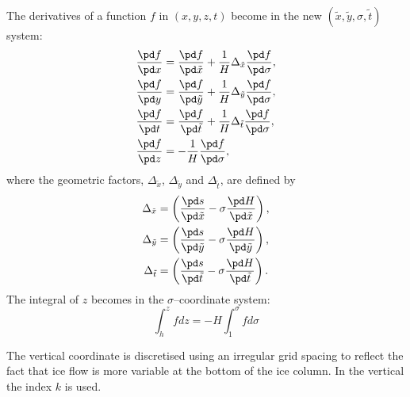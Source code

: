 The derivatives of a function $f$ in $(x,y,z,t)$ become in the new $(\tilde{x},\tilde{y},\sigma,\tilde{t})$ system:
\begin{subequations}
  \begin{align}
    \frac{\pd f}{\pd x} &= \frac{\pd f}{\pd\tilde{x}}+\frac1H\Delta_{\tilde{x}}\frac{\pd f}{\pd \sigma},\\
    \frac{\pd f}{\pd y} &= \frac{\pd f}{\pd\tilde{y}}+\frac1H\Delta_{\tilde{y}}\frac{\pd f}{\pd \sigma},\\
    \frac{\pd f}{\pd t} &= \frac{\pd f}{\pd\tilde{t}}+\frac1H\Delta_{\tilde{t}}\frac{\pd f}{\pd \sigma},\\
    \frac{\pd f}{\pd z} &= -\frac1H\frac{\pd f}{\pd\sigma},
  \end{align}
\end{subequations}
where  the geometric factors, $\Delta_{\tilde{x}}$, $\Delta_{\tilde{y}}$ and $\Delta_{\tilde{t}}$, are defined by
\begin{subequations}
  \begin{align}
  \Delta_{\tilde{x}}&=\left(\frac{\pd s}{\pd\tilde{x}}-\sigma\frac{\pd H}{\pd\tilde{x}}\right),\\
  \Delta_{\tilde{y}}&=\left(\frac{\pd s}{\pd\tilde{y}}-\sigma\frac{\pd H}{\pd\tilde{y}}\right),\\
  \Delta_{\tilde{t}}&=\left(\frac{\pd s}{\pd\tilde{t}}-\sigma\frac{\pd H}{\pd\tilde{t}}\right).
  \end{align}
\end{subequations}
The integral of $z$ becomes in the $\sigma$--coordinate system:
\begin{equation}
  \int_h^zfdz=-H\int_1^\sigma fd\sigma
\end{equation}

The vertical coordinate is discretised using an irregular grid spacing to reflect the fact that ice flow is more variable at the bottom of the ice column. In the vertical the index $k$ is used. 
